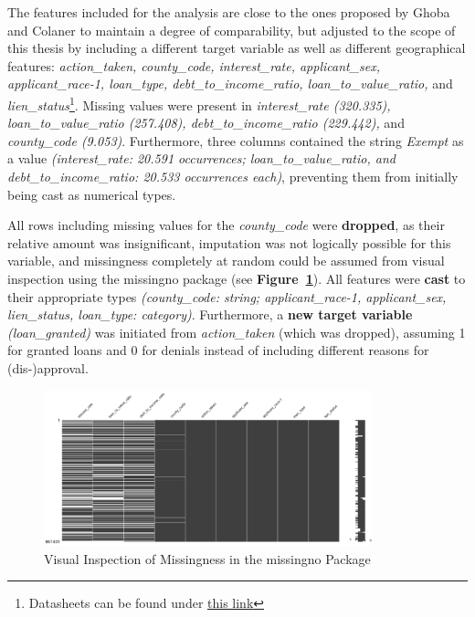The features included for the analysis are close to the ones proposed by Ghoba and Colaner to maintain a degree of comparability, but adjusted to the scope of this thesis by including a different target variable as well as different geographical features: 
\textit{action\_taken, county\_code, interest\_rate, applicant\_sex, applicant\_race-1, loan\_type, debt\_to\_income\_ratio, loan\_to\_value\_ratio,} and \textit{lien\_status}\footnote{Datasheets can be found under \href{https://ffiec.cfpb.gov/documentation/publications/loan-level-datasets/lar-data-fields}{this link}}. 
Missing values were present in \textit{interest\_rate (320.335), loan\_to\_value\_ratio (257.408), debt\_to\_income\_ratio (229.442),} and \textit{county\_code (9.053)}. 
Furthermore, three columns contained the string \textit{Exempt} as a value \textit{(interest\_rate: 20.591 occurrences; loan\_to\_value\_ratio, and debt\_to\_income\_ratio: 20.533 occurrences each)}, preventing them from initially being cast as numerical types.

All rows including missing values for the \textit{county\_code} were \textbf{dropped}, as their relative amount was insignificant, imputation was not logically possible for this variable, and missingness completely at random could be assumed from visual inspection using the missingno package (see \textbf{Figure~\ref{fig:CH03_Missingno_Completeness}}). 
All features were \textbf{cast} to their appropriate types \textit{(county\_code: string; applicant\_race-1, applicant\_sex, lien\_status, loan\_type: category)}. Furthermore, a \textbf{new target variable} \textit{(loan\_granted)} was initiated from \textit{action\_taken} (which was dropped), assuming 1 for granted loans and 0 for denials instead of including different reasons for (dis-)approval.

\begin{figure}[h]
    \centering
    \includegraphics[width=0.85\textwidth]{images/CH03_Missingno_Completeness.png}
    \caption{Visual Inspection of Missingness in the missingno Package}
    \label{fig:CH03_Missingno_Completeness}
\end{figure}

